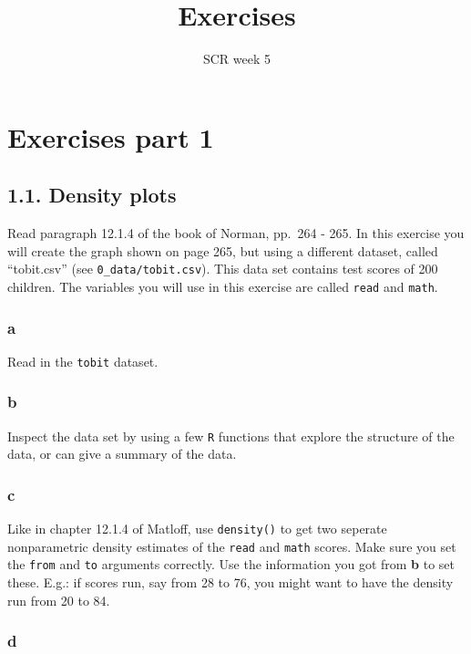 \documentclass[]{article}
\title{Exercises}
\subtitle{SCR week 5}
\author{}
\date{}
\begin{document}
\maketitle

\hypertarget{exercises-part-1}{%
\section{Exercises part 1}\label{exercises-part-1}}

\hypertarget{density-plots}{%
\subsection{1.1. Density plots}\label{density-plots}}

Read paragraph 12.1.4 of the book of Norman, pp.~264 - 265. In this
exercise you will create the graph shown on page 265, but using a
different dataset, called ``tobit.csv'' (see
\texttt{0\_data/tobit.csv}). This data set contains test scores of 200
children. The variables you will use in this exercise are called
\texttt{read} and \texttt{math}.

\hypertarget{a}{%
\subsubsection{a}\label{a}}

Read in the \texttt{tobit} dataset.

\hypertarget{b}{%
\subsubsection{b}\label{b}}

Inspect the data set by using a few \texttt{R} functions that explore
the structure of the data, or can give a summary of the data.

\hypertarget{c}{%
\subsubsection{c}\label{c}}

Like in chapter 12.1.4 of Matloff, use \texttt{density()} to get two
seperate nonparametric density estimates of the \texttt{read} and
\texttt{math} scores. Make sure you set the \texttt{from} and
\texttt{to} arguments correctly. Use the information you got from
\textbf{b} to set these. E.g.: if scores run, say from 28 to 76, you
might want to have the density run from 20 to 84.

\hypertarget{d}{%
\subsubsection{d}\label{d}}
\end{document}
